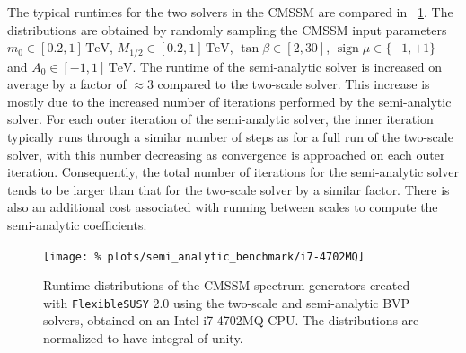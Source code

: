 \documentclass[final,3p,11pt,pdflatex]{elsarticle}
\makeatletter
\newcommand{\fs}{\texttt{FlexibleSUSY}\@\xspace}
\newcommand{\fstwo}{\fs 2.0\@\xspace}
\newcommand{\unit}[1]{\,\text{#1}}      %
\newcommand{\figref}[1]{\figurename~\ref{#1}}
\newcommand{\azero}{\ensuremath{A_0}\xspace}
\newcommand{\mhalf}{\ensuremath{M_{1/2}}\xspace}
\newcommand{\mzero}{\ensuremath{m_0}\xspace}
\DeclareMathOperator{\sign}{sign}
\makeatother
\begin{document}
The typical runtimes for the two solvers in the CMSSM are compared in
\figref{fig:semi_analytic_benchmark}.  The distributions are obtained
by randomly sampling the CMSSM input parameters
$\mzero\in [0.2,1]\unit{TeV}$, $\mhalf\in [0.2,1]\unit{TeV}$,
$\tan\beta\in [2,30]$, $\sign\mu\in\{-1,+1\}$ and
$\azero\in [-1,1]\unit{TeV}$.
The runtime of the semi-analytic solver is increased on average by a factor of
$\approx 3$ compared to the two-scale solver.  This increase is
mostly due to the increased number of iterations performed by the semi-analytic
solver.  For each outer iteration of the semi-analytic solver, the inner
iteration typically runs through a similar number of steps as for a full run
of the two-scale solver, with this number decreasing as convergence is
approached on each outer iteration.  Consequently, the total number of
iterations for the semi-analytic solver tends to be larger than that for the
two-scale solver by a similar factor.  There is also an additional cost
associated with running between scales to compute the semi-analytic
coefficients.
%
\begin{figure}[tbh]
  \centering
  \texttt{[image: \%
    plots/semi\_analytic\_benchmark/i7-4702MQ]}
  \caption{Runtime distributions of the CMSSM spectrum generators created with
    \fstwo using the two-scale and semi-analytic BVP solvers, obtained on
    an Intel i7-4702MQ CPU\@.  The distributions are normalized to have integral
    of unity.}
\label{fig:semi_analytic_benchmark}
\end{figure}
\end{document}
